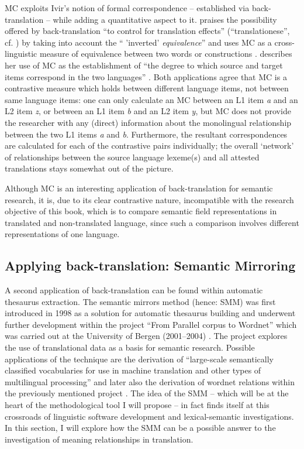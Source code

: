 MC exploits Ivir’s notion of formal correspondence – established via back-translation – while adding a quantitative aspect to it. \citet{de_los_angeles_gomez_gonzalez_causative_2008} praises the possibility offered by back-translation “to control for translation effects” (“translationese”, cf. \citealt{wollin_translationese_1986}) by taking into account the “ 'inverted' \textit{equivalence}” \citep[186]{de_los_angeles_gomez_gonzalez_causative_2008} and uses MC as a cross-linguistic measure of equivalence between two words or constructions \citep{de_los_angeles_gomez_gonzalez_causative_2008}. \citet{mortier_semantic_2010} describes her use of MC as the establishment of “the degree to which source and target items correspond in the two languages” \citep[410]{mortier_semantic_2010}. Both applications agree that MC is a contrastive measure which holds between different language items, not between same language items: one can only calculate an MC between an L1 item \textit{a} and an L2 item \textit{z}, or between an L1 item \textit{b} and an L2 item \textit{y}, but MC does not provide the researcher with any (direct) information about the monolingual relationship between the two L1 items \textit{a} and \textit{b}. Furthermore, the resultant correspondences are calculated for each of the contrastive pairs individually; the overall ‘network’ of relationships between the source language lexeme(s) and all attested translations stays somewhat out of the picture.

Although MC is an interesting application of back-translation for semantic research, it is, due to its clear contrastive nature, incompatible with the research objective of this book, which is to compare semantic field representations in translated and non-translated language, since such a comparison involves different representations of one language.

\subsection{Applying back-translation: Semantic Mirroring}
\label{sec:2.3.4} 
A second application of back-translation can be found within automatic thesaurus extraction. The semantic mirrors method (hence: SMM) was first introduced in 1998 as a solution for automatic thesaurus building and underwent further development within the project “From Parallel corpus to Wordnet” which was carried out at the University of Bergen (2001--2004) \citep[311]{aijmer_translations_2004}. The project explores the use of translational data as a basis for semantic research. Possible applications of the technique are the derivation of “large-scale semantically classified vocabularies for use in machine translation and other types of multilingual processing” \citep[51]{johansson_translational_1998} and later also the derivation of wordnet relations within the previously mentioned project \citep[311]{aijmer_translations_2004}. The idea of the SMM – which will be at the heart of the methodological tool I will propose – in fact finds itself at this crossroads of linguistic software development and lexical-semantic investigations. In this section, I will explore how the SMM can be a possible answer to the investigation of meaning relationships in translation.

